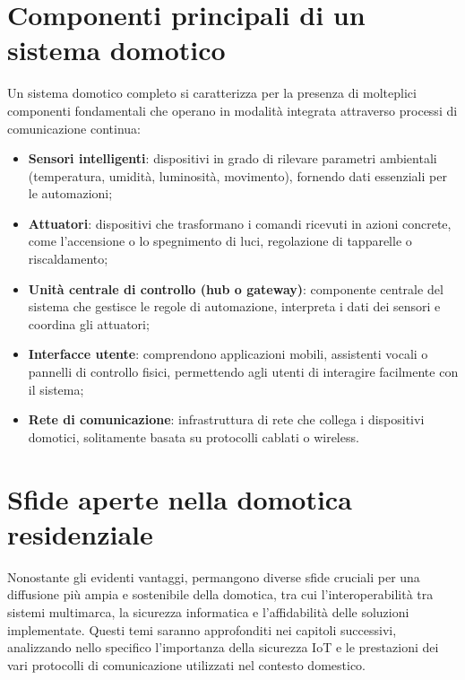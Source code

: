 \section{Componenti principali di un sistema domotico}
Un sistema domotico completo si caratterizza per la presenza di molteplici componenti fondamentali che operano in modalità integrata attraverso processi di comunicazione continua:
\begin{itemize}
    \item \textbf{Sensori intelligenti}: dispositivi in grado di rilevare parametri ambientali (temperatura, umidità, luminosità, movimento), fornendo dati essenziali per le automazioni;
    \item \textbf{Attuatori}: dispositivi che trasformano i comandi ricevuti in azioni concrete, come l'accensione o lo spegnimento di luci, regolazione di tapparelle o riscaldamento;
    \item \textbf{Unità centrale di controllo (hub o gateway)}: componente centrale del sistema che gestisce le regole di automazione, interpreta i dati dei sensori e coordina gli attuatori;
    \item \textbf{Interfacce utente}: comprendono applicazioni mobili, assistenti vocali o pannelli di controllo fisici, permettendo agli utenti di interagire facilmente con il sistema;
    \item \textbf{Rete di comunicazione}: infrastruttura di rete che collega i dispositivi domotici, solitamente basata su protocolli cablati o wireless.
\end{itemize}

\section{Sfide aperte nella domotica residenziale}
Nonostante gli evidenti vantaggi, permangono diverse sfide cruciali per una diffusione più ampia e sostenibile della domotica, tra cui l'interoperabilità tra sistemi multimarca, la sicurezza informatica e l'affidabilità delle soluzioni implementate. Questi temi saranno approfonditi nei capitoli successivi, analizzando nello specifico l'importanza della sicurezza IoT e le prestazioni dei vari protocolli di comunicazione utilizzati nel contesto domestico.